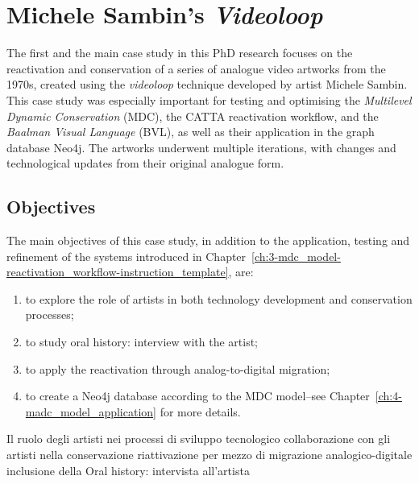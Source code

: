 \chapter{\label{ax:a-michele_sambin_videoloop}Michele Sambin's \textit{Videoloop}}

The first and the main case study in this PhD research focuses on the reactivation and conservation of a series of analogue video artworks from the 1970s, created using the \textit{videoloop} technique developed by artist Michele Sambin. This case study was especially important for testing and optimising the \textit{Multilevel Dynamic Conservation} (MDC), the CATTA reactivation workflow, and the \textit{Baalman Visual Language} (BVL), as well as their application in the graph database Neo4j. The artworks underwent multiple iterations, with changes and technological updates from their original analogue form.

\section{Objectives}
The main objectives of this case study, in addition to the application, testing and refinement of the systems introduced in Chapter~\ref{ch:3-mdc_model-reactivation_workflow-instruction_template}, are:
\begin{enumerate}
    \item to explore the role of artists in both technology development and conservation processes;
    \item to study oral history: interview with the artist;
    \item to apply the reactivation through analog-to-digital migration;
    \item to create a Neo4j database according to the MDC model–see Chapter~\ref{ch:4-madc_model_application} for more details.
\end{enumerate}

Il ruolo degli artisti nei processi di sviluppo tecnologico
collaborazione con gli artisti nella conservazione
riattivazione per mezzo di migrazione analogico-digitale
inclusione della Oral history: intervista all'artista

